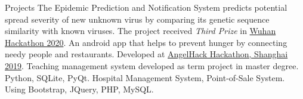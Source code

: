 \begin{rubric}{Projects}
	 The Epidemic Prediction and Notification System predicts potential spread severity of new unknown virus by comparing its genetic sequence similarity with known viruses. The project received \textit{Third Prize} in \href{https://community.wuhan2020.org.cn/en-us/hackathonKanban/index.html}{Wuhan Hackathon 2020}. 
	An android app that helps to prevent hunger by connecting needy people and restaurants. Developed at \href{https://www.youtube.com/watch?v=FYjb6BpP0Y0}{AngelHack Hackathon, Shanghai 2019}.
	Teaching management system developed as term project in master degree. Python, SQLite, PyQt.
	Hospital Management System, Point-of-Sale System. Using Bootstrap, JQuery, PHP, MySQL. 

\end{rubric}